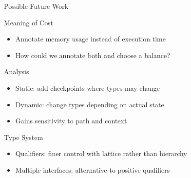 \documentclass{beamer}
\begin{document}
\begin{frame}{Possible Future Work}
  \begin{block}{Meaning of Cost}
    \begin{itemize}
    \item Annotate memory usage instead of execution time
    \item How could we annotate both and choose a balance?
    \end{itemize}
  \end{block}
\pause
  \begin{block}{Analysis}
    \begin{itemize}
    \item Static: add checkpoints where types may change
    \item Dynamic: change types depending on actual state
    \item Gains sensitivity to path and context
    \end{itemize}
  \end{block}
\pause
  \begin{block}{Type System}
    \begin{itemize}
    \item Qualifiers: finer control with lattice rather than hierarchy
    \item Multiple interfaces: alternative to positive qualifiers
    \end{itemize}
  \end{block}
\end{frame}
\end{document}
